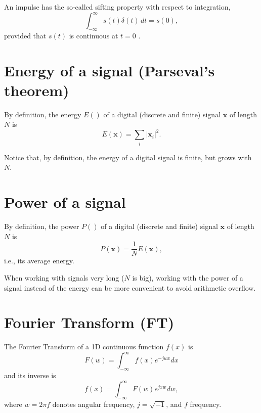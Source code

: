 \documentclass{article}
\begin{document}
An impulse has the so-called sifting
property with respect to integration,
\begin{equation}
\int_{-\infty}^{\infty} s(t)\delta(t) \, dt = s(0),
\end{equation}
provided that $s(t)$ is continuous at $t=0$ \cite{gonzalez1992digital}.


\section{Energy of a signal (Parseval's theorem)}

By definition, the energy $E()$ of a digital (discrete and finite) signal
$\mathbf{x}$ of length $N$ is
\begin{equation}
  E(\mathbf{x}) = \sum_{i}|\mathbf{x}_i|^2.
\end{equation}

Notice that, by definition, the energy of a digital signal is finite,
but grows with $N$.


\section{Power of a signal}

By definition, the power $P()$ of a digital (discrete and finite) signal
$\mathbf{x}$ of length $N$ is
\begin{equation}
  P(\mathbf{x}) = \frac{1}{N}E(\mathbf{x}),
\end{equation}
i.e., its average energy.

When working with signals very long ($N$ is big), working with the
power of a signal instead of the energy can be more convenient to
avoid arithmetic overflow.


\section{Fourier Transform (FT)}

The Fourier Transform of a 1D continuous function $f(x)$ is
\begin{equation}
  F(w) = \int_{-\infty}^{\infty}f(x)e^{-jwx}dx
  \label{eq:FT}
\end{equation}
and its inverse is
\begin{equation}
  f(x) = \int_{-\infty}^{\infty}F(w)e^{jxw}dw,
\end{equation}
where $w=2\pi f$ denotes angular frequency, $j=\sqrt{-1}$, and $f$ frequency.
\end{document}
